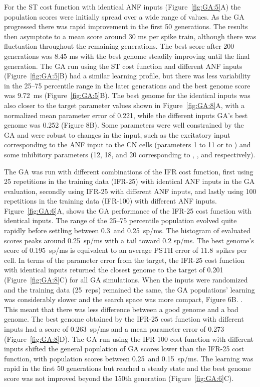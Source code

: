 For the ST cost function with identical ANF inputs
(Figure~\ref{fig:GA:5}A) the population scores were initially spread over
a wide range of values. As the GA progressed there was rapid
improvement in the first 50 generations. The results then asymptote to
a mean score around 30 ms per spike train, although there was
fluctuation throughout the remaining generations.  The best score
after 200 generations was 8.45 ms with the best genome steadily
improving until the final generation.  The GA run using the ST cost
function and different ANF inputs (Figure~\ref{fig:GA:5}B) had a similar
learning profile, but there was less variability in the 25--75
percentile range in the later generations and the best genome score
was 9.72~ms (Figure~\ref{fig:GA:5}B).  The best genome for the identical
inputs was also closer to the target parameter values shown in
Figure~\ref{fig:GA:8}A, with a normalized mean parameter error of 0.221,
while the different inputs GA's best genome was 0.252 (Figure
8B). Some parameters were well constrained by the GA and were robust
to changes in the input, such as the excitatory input corresponding to
the ANF input to the CN cells (parameters 1 to 11 or \wANFTS to
\wLSRGLG) and some inhibitory parameters (12, 18, and 20 corresponding
to \wDSTS, \wGLGTS, and \sGLGTS respectively).

\smallskip{} 

The GA was run with different combinations of the IFR cost function,
first using 25 repetitions in the training data (IFR-25) with
identical ANF inputs in the GA evaluation, secondly using IFR-25 with
different ANF inputs, and lastly using 100 repetitions in the training
data (IFR-100) with different ANF inputs. Figure~\ref{fig:GA:6}A, shows
the GA performance of the IFR-25 cost function with identical
inputs. The range of the 25--75 percentile population evolved quite
rapidly before settling between 0.3~and 0.25~sp/ms.  The histogram of
evaluated scores peaks around 0.25~sp/ms with a tail toward 0.2 sp/ms.
The best genome's score of 0.195~sp/ms is equivalent to an average
PSTH error of 11.8~spikes per cell. In terms of the parameter error
from the target, the IFR-25 cost function with identical inputs
returned the closest genome to the target of 0.201
(Figure~\ref{fig:GA:8}C) for all GA simulations. When the inputs were
randomized and the training data (25~reps) remained the same, the GA
populations' learning was considerably slower and the search space was
more compact, Figure 6B. . This meant that there was less difference between a good
genome and a bad genome.  The best genome obtained by the IFR-25 cost
function with different inputs had a score of 0.263~sp/ms and a mean
parameter error of 0.273 (Figure~\ref{fig:GA:8}D). The GA run using the
IFR-100 cost function with different inputs shifted the general
population of GA scores lower than the IFR-25 cost function, with
population scores between 0.25~and 0.15~sp/ms. The learning was rapid
in the first 50 generations but reached a steady state and the best
genome score was not improved beyond the 150th generation
(Figure~\ref{fig:GA:6}C).  %

